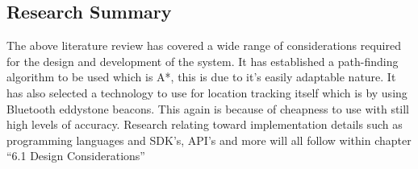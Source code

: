\subsection{Research Summary}
The above literature review has covered a wide range of considerations required for the design and development of the system. It has established a path-finding algorithm to be used which is A*, this is due to it’s easily adaptable nature. It has also selected a technology to use for location tracking itself which is by using Bluetooth eddystone beacons. This again is because of cheapness to use with still high levels of accuracy.
Research relating toward implementation details such as programming languages and SDK’s, API’s and more will all follow within chapter “6.1 Design Considerations”
